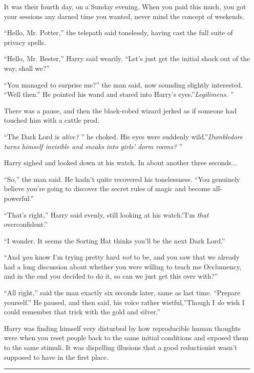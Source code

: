 It was their fourth day, on a Sunday evening. When you paid this much,
you got your sessions any darned time you wanted, never mind the concept
of weekends.

``Hello, Mr. Potter,'' the telepath said tonelessly, having cast the
full suite of privacy spells.

``Hello, Mr. Bester,'' Harry said wearily. ``Let's just get the initial
shock out of the way, shall we?''

``You managed to surprise me?'' the man said, now sounding slightly
interested. ``Well then.'' He pointed his wand and stared into Harry's
eyes.''\emph{Legilimens.} ''

There was a pause, and then the black-robed wizard jerked as if someone
had touched him with a cattle prod.

``The Dark Lord is \emph{alive?} '' he choked. His eyes were suddenly
wild.''\emph{Dumbledore turns himself invisible and sneaks into girls'
dorm rooms?} ''

Harry sighed and looked down at his watch. In about another three
seconds...

``So,'' the man said. He hadn't quite recovered his tonelessness. ``You
genuinely believe you're going to discover the secret rules of magic and
become all-powerful.''

``That's right,'' Harry said evenly, still looking at his watch.''I'm
\emph{that} overconfident.''

``I wonder. It seems the Sorting Hat thinks you'll be the next Dark
Lord.''

``And \emph{you} know I'm trying pretty hard \emph{not} to be, and you
saw that we already had a long discussion about whether you were willing
to teach me Occlumency, and in the end you decided to do it, so can we
just get this over with?''

``All right,'' said the man exactly six seconds later, same as last
time. ``Prepare yourself.'' He paused, and then said, his voice rather
wistful,''Though I \emph{do} wish I could remember that trick with the
gold and silver.''

Harry was finding himself very disturbed by how reproducible human
thoughts were when you reset people back to the same initial conditions
and exposed them to the same stimuli. It was dispelling illusions that a
good reductionist wasn't supposed to have in the first place.

\begin{center}\rule{3in}{0.4pt}\end{center}

